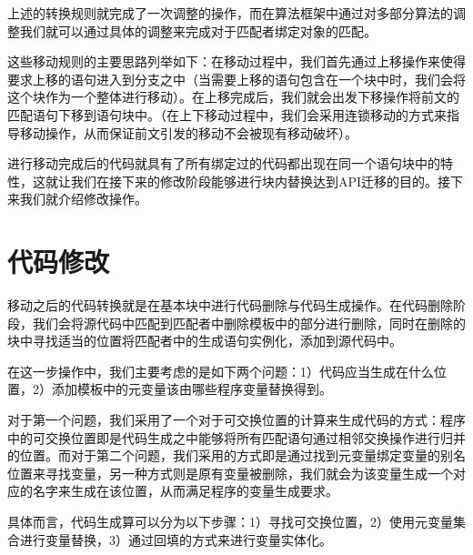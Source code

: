 {\begin{center}
\DP
\end{center}
}


上述的转换规则就完成了一次调整的操作，而在算法框架中通过对多部分算法的调整我们就可以通过具体的调整来完成对于匹配者绑定对象的匹配。

这些移动规则的主要思路列举如下：在移动过程中，我们首先通过上移操作来使得要求上移的语句进入到分支之中（当需要上移的语句包含在一个块中时，我们会将这个块作为一个整体进行移动）。在上移完成后，我们就会出发下移操作将前文的匹配语句下移到语句块中。（在上下移动过程中，我们会采用连锁移动的方式来指导移动操作，从而保证前文引发的移动不会被现有移动破坏）。

进行移动完成后的代码就具有了所有绑定过的代码都出现在同一个语句块中的特性，这就让我们在接下来的修改阶段能够进行块内替换达到API迁移的目的。接下来我们就介绍修改操作。

\section{代码修改}

移动之后的代码转换就是在基本块中进行代码删除与代码生成操作。在代码删除阶段，我们会将源代码中匹配到匹配者中删除模板中的部分进行删除，同时在删除的块中寻找适当的位置将匹配者中的生成语句实例化，添加到源代码中。

在这一步操作中，我们主要考虑的是如下两个问题：1）代码应当生成在什么位置，2）添加模板中的元变量该由哪些程序变量替换得到。

对于第一个问题，我们采用了一个对于可交换位置的计算来生成代码的方式：程序中的可交换位置即是代码生成之中能够将所有匹配语句通过相邻交换操作进行归并的位置。而对于第二个问题，我们采用的方式即是通过找到元变量绑定变量的别名位置来寻找变量，另一种方式则是原有变量被删除，我们就会为该变量生成一个对应的名字来生成在该位置，从而满足程序的变量生成要求。

具体而言，代码生成算可以分为以下步骤：1）寻找可交换位置，2）使用元变量集合进行变量替换，3）通过回填的方式来进行变量实体化。

